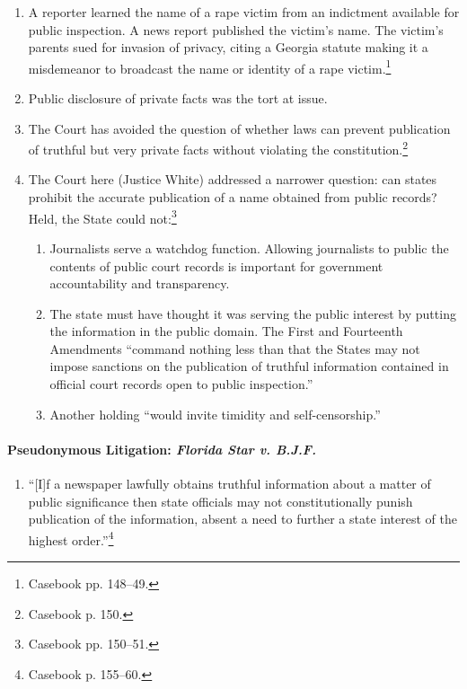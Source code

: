\begin{enumerate}
    \item A reporter learned the name of a rape victim from an indictment 
    available for public inspection. A news report published the victim's name. 
    The victim's parents sued for invasion of privacy, citing a Georgia statute 
    making it a misdemeanor to broadcast the name or identity of a rape 
    victim.\footnote{Casebook pp.  148--49.}
    \item Public disclosure of private facts was the tort at issue.
    \item The Court has avoided the question of whether laws can prevent 
    publication of truthful but very private facts without violating the 
    constitution.\footnote{Casebook p. 150.}
    \item The Court here (Justice White) addressed a narrower question: can 
    states prohibit the accurate publication of a name obtained from public 
    records? Held, the State could not:\footnote{Casebook pp. 150--51.}
    \begin{enumerate}
        \item Journalists serve a watchdog function. Allowing journalists to 
        public the contents of public court records is important for government 
        accountability and transparency.
        \item The state must have thought it was serving the public interest by 
        putting the information in the public domain. The First and Fourteenth 
        Amendments ``command nothing less than that the States may not impose 
        sanctions on the publication of truthful information contained in 
        official court records open to public inspection.''
        \item Another holding ``would invite timidity and self-censorship.''
    \end{enumerate}
\end{enumerate}

\paragraph{Pseudonymous Litigation: \emph{Florida Star v. B.J.F.}}

\begin{enumerate}
    \item ``[I]f a newspaper lawfully obtains truthful information about a 
    matter of public significance then state officials may not constitutionally 
    punish publication of the information, absent a need to further a state 
    interest of the highest order.''\footnote{Casebook p. 155--60.}
\end{enumerate}

